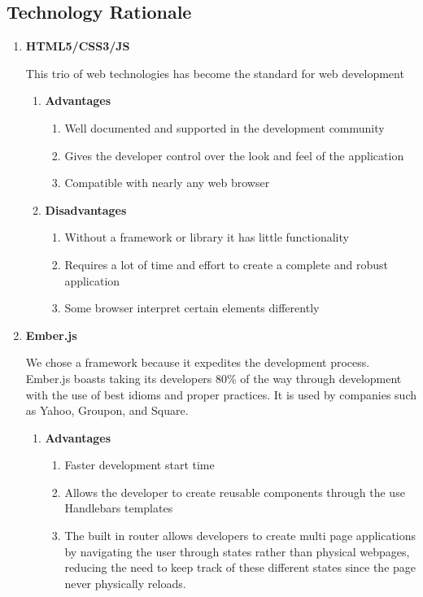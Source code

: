 \subsection{Technology Rationale}
\begin{enumerate}
\item \textbf{HTML5/CSS3/JS} \par This trio of web technologies has become the standard for web development
\begin{enumerate}
\item \textbf{Advantages}
\begin{enumerate}
\item Well documented and supported in the development community
\item Gives the developer control over the look and feel of the application
\item Compatible with nearly any web browser
\end{enumerate}
\item \textbf{Disadvantages}
\begin{enumerate}
\item Without a framework or library it has little functionality
\item Requires a lot of time and effort to create a complete and robust application
\item Some browser interpret certain elements differently
\end{enumerate}
\end{enumerate}
\item \textbf{Ember.js} \par We chose a framework because it expedites the development process. Ember.js boasts taking its developers 80\% of the way through development with the use of best idioms and proper practices. It is used by companies such as Yahoo, Groupon, and Square\cite{ember}.
\begin{enumerate}
\item \textbf{Advantages}
\begin{enumerate}
\item Faster development start time
\item Allows the developer to create reusable components through the use Handlebars templates
\item The built in router allows developers to create multi page applications by navigating the user through states rather than physical webpages, reducing the need to keep track of these different states since the page never physically reloads. 

\end{enumerate}
\end{enumerate}
\end{enumerate}

